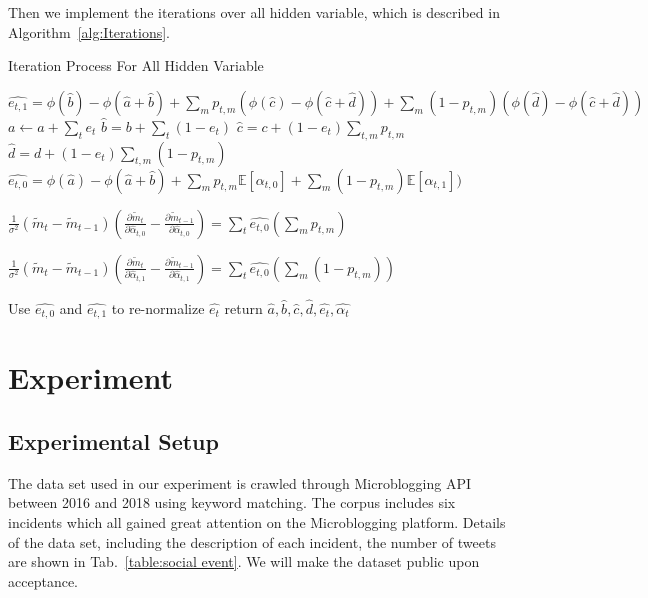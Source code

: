 \documentclass[runningheads]{llncs}
\newcommand{\Ep}{\mathbb{E}}
\begin{document}
Then we implement the iterations over all hidden variable, which is described in Algorithm~\ref{alg:Iterations}.

\vspace{-0.6cm}
\begin{algorithm}\label{alg:Iterations}
\caption{Iteration Process For All Hidden Variable}
\begin{algorithmic}
\STATE $\hat{e_{t,1}} = \phi(\hat{b})-\phi(\hat{a}+\hat{b}) + \sum_{m}  p_{t,m} (\phi(\hat{c})-\phi(\hat{c}+\hat{d})) +\sum_m (1-p_{t,m}) (\phi(\hat{d})-\phi(\hat{c}+\hat{d}))$\;
\STATE $a \leftarrow  a+ \sum_{t} e_{t}$\;
\STATE $\hat{b}  =  b+ \sum_{t} (1-e_{t})$\;
\STATE $\hat{c}  =  c+ (1-e_{t}) \sum_{t,m} p_{t,m}$\;
\STATE $\hat{d}  =  d+ (1-e_{t}) \sum_{t,m} (1-p_{t,m})$\;
\STATE $\hat{e_{t,0}}=\phi(\hat{a})-\phi(\hat{a}+\hat{b}) + \sum_{m}  p_{t,m}   \Ep[\alpha_{t,0}] +\sum_m (1-p_{t,m}) \Ep[\alpha_{t,1}])$\;

\STATE $\frac{1}{\sigma^2}(\widetilde{m}_{t}-\widetilde{m}_{t-1})(\frac{\partial \widetilde{m}_{t}}{\partial \hat{\alpha}_{t,0}}-\frac{\partial \widetilde{m}_{t-1}}{\partial \hat{\alpha}_{t,0}}) = \sum_t \hat{e_{t,0}} (\sum_m p_{t,m})$

\STATE $\frac{1}{\sigma^2}(\widetilde{m}_{t}-\widetilde{m}_{t-1})(\frac{\partial \widetilde{m}_{t}}{\partial \hat{\alpha}_{t,1}}-\frac{\partial \widetilde{m}_{t-1}}{\partial \hat{\alpha}_{t,1}}) = \sum_t \hat{e_{t,0}} (\sum_m (1-p_{t,m}))$

\ENDWHILE\;
Use $\hat{e_{t,0}}$ and $\hat{e_{t,1}}$ to re-normalize $\hat{e_{t}}$\;
return $\hat{a},\hat{b},\hat{c},\hat{d},\hat{e_{t}},\hat{\alpha_{t}}$
\end{algorithmic}
\end{algorithm}
\vspace{-0.6cm}




\section{Experiment}\label{sec:Experiment}
\subsection{Experimental Setup}
The data set used in our experiment is crawled through Microblogging API between 2016 and 2018 using keyword matching. The corpus includes six incidents which all gained great attention on the Microblogging platform. Details of the data set, including the description of each incident, the number of tweets are shown in Tab.~\ref{table:social event}. We will make the dataset public upon acceptance.
\end{document}
